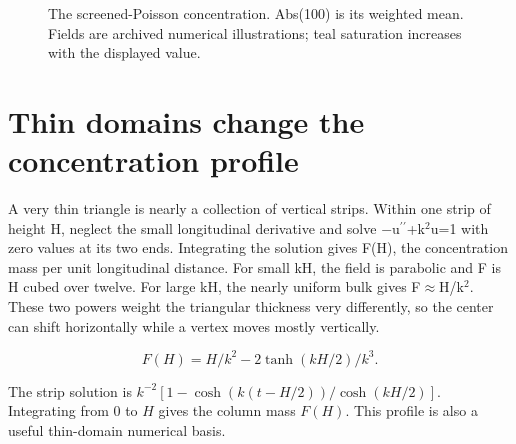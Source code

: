 \documentclass[11pt,oneside,openany]{book}
\begin{document}
\begin{figure}[htbp]
\caption[The screened-Poisson concentration]{The screened-Poisson concentration. Abs(100) is its weighted mean. Fields are archived numerical illustrations; teal saturation increases with the displayed value.}\label{fig:field-Abs100.0}
\end{figure}

\section{Thin domains change the concentration profile}\label{sec:slide69}

A very thin triangle is nearly a collection of vertical strips. Within one strip of height H, neglect the small longitudinal derivative and solve \ensuremath{-}u\ensuremath{^{\prime\prime}}+k\ensuremath{^2}u=1 with zero values at its two ends. Integrating the solution gives F(H), the concentration mass per unit longitudinal distance. For small kH, the field is parabolic and F is H cubed over twelve. For large kH, the nearly uniform bulk gives F\ensuremath{\approx}H/k\ensuremath{^2}. These two powers weight the triangular thickness very differently, so the center can shift horizontally while a vertex moves mostly vertically.


\[F(H)=H/k^2-2\tanh(kH/2)/k^3.\]


The strip solution is
$k^{-2}[1-\cosh(k(t-H/2))/\cosh(kH/2)]$.
Integrating from $0$ to $H$ gives the column mass $F(H)$.
This profile is also a useful thin-domain numerical basis.
\end{document}
